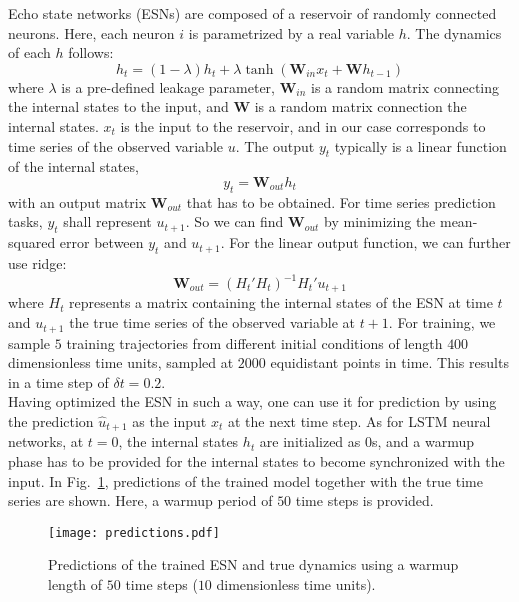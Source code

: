 \documentclass{article}
\begin{document}
Echo state networks (ESNs) are composed of a reservoir of randomly connected neurons.
Here, each neuron $i$ is parametrized by a real variable $h$. The dynamics of each $h$
follows:
\begin{equation}
  h_{t} = \left(1-\lambda\right) h_t + \lambda \tanh\left(\mathbf{W}_{in} x_t + \mathbf{W} h_{t-1}\right)
\end{equation}
where $\lambda$ is a pre-defined leakage parameter, $\mathbf{W}_{in}$ is a random matrix connecting the internal states to the input, and $\mathbf{W}$ is a random matrix connection the internal states.
$x_t$ is the input to the reservoir, and in our case corresponds to time series of the observed variable $u$. The output $y_t$ typically is a linear function of the internal states,
\begin{equation}
  y_t = \mathbf{W}_{out} h_t
\end{equation}
with an output matrix $\mathbf{W}_{out}$ that has to be obtained. For time series prediction tasks,
$y_t$ shall represent $u_{t+1}$.
So we can find $\mathbf{W}_{out}$ by minimizing the mean-squared error between $y_t$ and $u_{t+1}$.
For the linear output function, we can further use ridge:
\begin{equation}
  \mathbf{W}_{out} = \left(H_t' H_t\right)^{-1}H_t'u_{t+1}
\end{equation}
where $H_t$ represents a matrix containing the internal states of the ESN at time $t$ and $u_{t+1}$ the true time series of the observed variable at $t+1$.
For training, we sample $5$ training trajectories from different initial conditions of length $400$ dimensionless time units, sampled at $2000$ equidistant points in time. This results in a time step of $\delta t=0.2$.\\
Having optimized the ESN in such a way, one can use it for prediction by using the prediction $\hat{u}_{t+1}$ as the input $x_t$ at the next time step.
As for LSTM neural networks, at $t=0$, the internal states $h_t$ are initialized as $0$s, and a warmup phase has to be provided for the internal states to become synchronized with the input.
In Fig.~\ref{fig:prediction}, predictions of the trained model together with the true time series are shown.
Here, a warmup period of $50$ time steps is provided.

\begin{figure}[ht]
  \centering
  \texttt{[image: predictions.pdf]}
  \caption{Predictions of the trained ESN and true dynamics using a warmup length of $50$ time steps ($10$ dimensionless time units).}
  \label{fig:prediction}
\end{figure}
\end{document}
